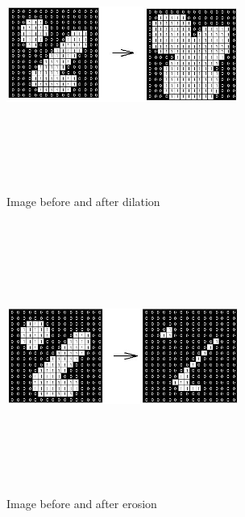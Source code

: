 \documentclass[journal]{IEEEtran}
\begin{document}
\begin{figure}
\includegraphics[width=3.0in,height=3.5in,clip,keepaspectratio]{resources/implementation/dilation}
\centering
\caption{Image before and after dilation}
\end{figure}

\begin{figure}
\includegraphics[width=3.0in,height=3.5in,clip,keepaspectratio]{resources/implementation/erosion}
\centering
\caption{Image before and after erosion}
\end{figure}
\end{document}
